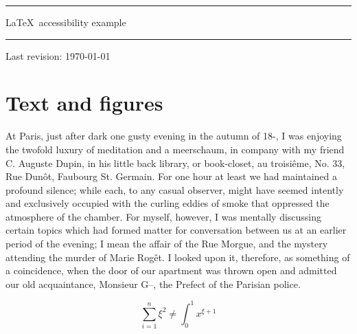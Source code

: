 


%




\usepackage[utf8]{inputenc}
\usepackage{graphicx}



\HandleMathMode


\thispagestyle{empty}
\vfill
\hrule
\vspace{20mm}
\centerline{\Huge \sc \LaTeX\ accessibility example}
\vspace{20mm}
\hrule
\vspace{10mm}
\centerline{\hfill Last revision: \today}
\vfill
\strut
\pagebreak



\chapter{Text and figures}


At Paris, just after dark one gusty evening in the autumn of 18-, I was
enjoying the twofold luxury of meditation and a meerschaum, in company
with my friend C. Auguste Dupin, in his little back library, or
book-closet, au troisiême, No. 33, Rue Dunôt, Faubourg St. Germain. For
one hour at least we had maintained a profound silence; while each, to
any casual observer, might have seemed intently and exclusively occupied
with the curling eddies of smoke that oppressed the atmosphere of the
chamber. For myself, however, I was mentally discussing certain topics
which had formed matter for conversation between us at an earlier period
of the evening; I mean the affair of the Rue Morgue, and the mystery
attending the murder of Marie Rogêt. I looked upon it, therefore, as
something of a coincidence, when the door of our apartment was thrown
open and admitted our old acquaintance, Monsieur G--, the Prefect of the
Parisian police.

\begin{equation}
\sum_{i=1}^n \xi^2 \neq \int_0^1 x^{\xi+1}
\end{equation}

